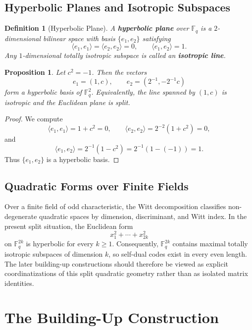 \documentclass[12pt]{article}
\newtheorem{defn}{Definition}[section]
\newtheorem{prop}[theorem]{Proposition}
\newcommand{\F}{\mathbb{F}}
\begin{document}
\subsection{Hyperbolic Planes and Isotropic Subspaces}

\begin{defn}[Hyperbolic Plane]\label{def:hyp}
{\rm
A \textbf{hyperbolic plane} over $\F_q$ is a $2$-dimensional bilinear space with basis $\{e_1,e_2\}$ satisfying
\[
\langle e_1,e_1\rangle = \langle e_2,e_2\rangle = 0,
\qquad
\langle e_1,e_2\rangle = 1.
\]
Any $1$-dimensional totally isotropic subspace is called an \textbf{isotropic line}.
}
\end{defn}

\begin{prop}\label{prop:eucl-hyp}
Let $c^2=-1$. Then the vectors
\[
e_1=(1,c), \qquad e_2=(2^{-1},-2^{-1}c)
\]
form a hyperbolic basis of\/ $\F_q^2$. Equivalently, the line spanned by $(1,c)$ is isotropic and the Euclidean plane is split.
\end{prop}

\begin{proof}
We compute
\[
\langle e_1,e_1\rangle = 1+c^2 = 0,
\qquad
\langle e_2,e_2\rangle = 2^{-2}(1+c^2)=0,
\]
and
\[
\langle e_1,e_2\rangle
= 2^{-1}(1-c^2)
= 2^{-1}(1-(-1))
= 1.
\]
Thus $\{e_1,e_2\}$ is a hyperbolic basis.
\end{proof}

\subsection{Quadratic Forms over Finite Fields}

Over a finite field of odd characteristic, the Witt decomposition classifies non-degenerate quadratic spaces by dimension, discriminant, and Witt index. In the present split situation, the Euclidean form
\[
x_1^2+\cdots+x_{2k}^2
\]
on $\F_q^{2k}$ is hyperbolic for every $k \ge 1$. Consequently, $\F_q^{2k}$ contains maximal totally isotropic subspaces of dimension $k$, so self-dual codes exist in every even length. The later building-up constructions should therefore be viewed as explicit coordinatizations of this split quadratic geometry rather than as isolated matrix identities.


\section{The Building-Up Construction}
\label{sec:building-up}
\end{document}
